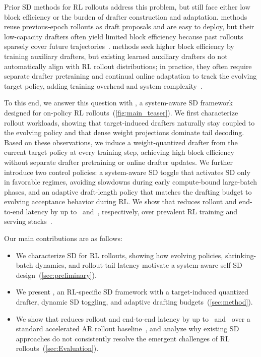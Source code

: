 Prior SD methods for RL rollouts address this problem, but still face either low block efficiency or the burden of drafter construction and adaptation.
\History{} methods reuse previous-epoch rollouts as draft proposals and are easy to deploy, but their low-capacity drafters often yield limited block efficiency because past rollouts sparsely cover future trajectories~\citep{liu2025spec,he2025history,shao2025beat}.
\Learned{} methods seek higher block efficiency by training auxiliary drafters, but existing learned auxiliary drafters do not automatically align with RL rollout distributions; in practice, they often require separate drafter pretraining and continual online adaptation to track the evolving target policy, adding training overhead and system complexity~\citep{zhang2025fastgrpo,chen2025respec,hu2026taming}.


To this end, we answer this question with \textbf{\methodtitle}, a system-aware SD framework designed for on-policy RL rollouts~(\cref{fig:main_teaser}).
We first characterize rollout workloads, showing that target-induced drafters naturally stay coupled to the evolving policy and that dense weight projections dominate tail decoding.
Based on these observations, we induce a weight-quantized drafter from the current target policy at every training step, achieving high block efficiency without separate drafter pretraining or online drafter updates.
We further introduce two control policies: a system-aware SD toggle that activates SD only in favorable regimes, avoiding slowdowns during early compute-bound large-batch phases, and an adaptive draft-length policy that matches the drafting budget to evolving acceptance behavior during RL.
We show that \methodtitle{} reduces rollout and end-to-end latency by up to~\speeduprollout{} and~\speedupete{}, respectively, over prevalent RL training and serving stacks~\citep{sheng2025hybridflow,kwon2023efficient}.

Our main contributions are as follows:

\begin{itemize}[leftmargin=*]
\item We characterize SD for RL rollouts, showing how evolving policies, shrinking-batch dynamics, and rollout-tail latency motivate a system-aware self-SD design~(\cref{sec:preliminary}).
\item We present \methodtitle{}, an RL-specific SD framework with a target-induced quantized drafter, dynamic SD toggling, and adaptive drafting budgets~(\cref{sec:method}).
\item We show that \methodtitle{} reduces rollout and end-to-end latency by up to~\speeduprollout{} and~\speedupete{} over a standard accelerated AR rollout baseline~\citep{sheng2025hybridflow,kwon2023efficient}, and analyze why existing SD approaches do not consistently resolve the emergent challenges of RL rollouts~(\cref{sec:Evaluation}).
\end{itemize}

